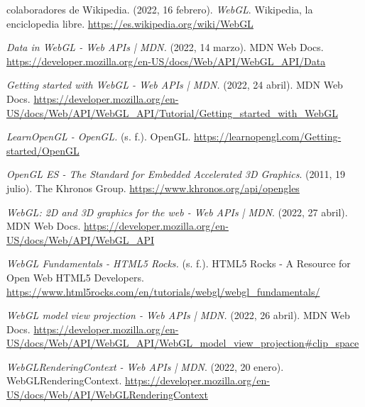 \begin{thebibliography}{99}
 colaboradores de Wikipedia. (2022, 16 febrero). \textit{WebGL}. Wikipedia, la enciclopedia libre. \url{https://es.wikipedia.org/wiki/WebGL}



 \textit{Data in WebGL - Web APIs | MDN.} (2022, 14 marzo). MDN Web Docs. \url{https://developer.mozilla.org/en-US/docs/Web/API/WebGL_API/Data}

 \textit{Getting started with WebGL - Web APIs | MDN.} (2022, 24 abril). MDN Web Docs. \url{https://developer.mozilla.org/en-US/docs/Web/API/WebGL_API/Tutorial/Getting_started_with_WebGL}

 \textit{LearnOpenGL - OpenGL.} (s. f.). OpenGL. \url{https://learnopengl.com/Getting-started/OpenGL}

 \textit{OpenGL ES - The Standard for Embedded Accelerated 3D Graphics}. (2011, 19 julio). The Khronos Group. \url{https://www.khronos.org/api/opengles}

 \textit{WebGL: 2D and 3D graphics for the web - Web APIs | MDN}. (2022, 27 abril). MDN Web Docs. \url{https://developer.mozilla.org/en-US/docs/Web/API/WebGL_API}

 \textit{WebGL Fundamentals - HTML5 Rocks.} (s. f.). HTML5 Rocks - A Resource for Open Web HTML5 Developers. \url{https://www.html5rocks.com/en/tutorials/webgl/webgl_fundamentals/}

 \textit{WebGL model view projection - Web APIs | MDN.} (2022, 26 abril). MDN Web Docs. \url{https://developer.mozilla.org/en-US/docs/Web/API/WebGL_API/WebGL_model_view_projection#clip_space}

 \textit{WebGLRenderingContext - Web APIs | MDN}. (2022, 20 enero). WebGLRenderingContext. \url{https://developer.mozilla.org/en-US/docs/Web/API/WebGLRenderingContext}

\end{thebibliography}

